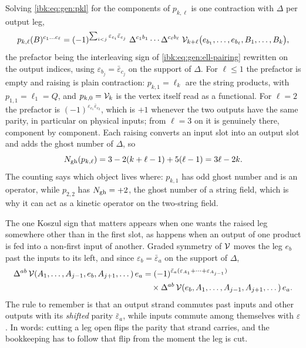 Solving \eqref{ibk:eq:gen:pkl} for the components of $p_{k,\ell}$ is one contraction with $\Delta$ per output leg,
\begin{equation}
  \label{ibk:eq:gen:pkl-comp}
  p_{k,\ell}(B)^{c_1\dots c_\ell}
    = (-1)^{\sum_{i<j}\varepsilon_{c_i}\bar\varepsilon_{c_j}}\;
      \Delta^{c_1b_1}\cdots\Delta^{c_\ell b_\ell}\;
      {\mathcal{V}}_{k+\ell}\bigl(e_{b_1},\dots,e_{b_\ell},B_1,\dots,B_k\bigr),
\end{equation}
the prefactor being the interleaving sign of \eqref{ibk:eq:gen:ell-pairing} rewritten on the output indices, using $\varepsilon_{b_j}=\bar\varepsilon_{c_j}$ on the support of $\Delta$. For $\ell\le1$ the prefactor is empty and raising is plain contraction: $p_{k,1}=\ell_k$ are the string products, with $p_{1,1}=\ell_1=Q$, and $p_{k,0}={\mathcal{V}}_k$ is the vertex itself read as a functional. For $\ell=2$ the prefactor is $(-1)^{\varepsilon_{c_1}\bar\varepsilon_{c_2}}$, which is $+1$ whenever the two outputs have the same parity, in particular on physical inputs; from $\ell=3$ on it is genuinely there, component by component. Each raising converts an input slot into an output slot and adds the ghost number of $\Delta$, so
\begin{equation}
  \label{ibk:eq:gen:ghost}
  N_{\rm gh}(p_{k,\ell})
    = 3-2(k+\ell-1)+5(\ell-1)
    = 3\ell-2k.
\end{equation}
The counting says which object lives where: $p_{k,1}$ has odd ghost number and is an operator, while $p_{2,2}$ has $N_{\rm gh}=+2$, the ghost number of a string field, which is why it can act as a kinetic operator on the two-string field.

The one Koszul sign that matters appears when one wants the raised leg somewhere other than in the first slot, as happens when an output of one product is fed into a non-first input of another. Graded symmetry of ${\mathcal{V}}$ moves the leg $e_b$ past the inputs to its left, and since $\varepsilon_b=\bar\varepsilon_a$ on the support of $\Delta$,
\begin{equation}
  \label{ibk:eq:gen:dressing}
  \begin{split}
    \Delta^{ab}\,{\mathcal{V}}(A_1,\dots,A_{j-1},e_b,A_{j+1},\dots)\,e_a
      &
      = (-1)^{\bar\varepsilon_a(\varepsilon_{A_1}+\cdots+\varepsilon_{A_{j-1}})}
    \\
      &
      \quad\times
        \Delta^{ab}\,{\mathcal{V}}(e_b,A_1,\dots,A_{j-1},A_{j+1},\dots)\,e_a.
  \end{split}
\end{equation}
The rule to remember is that an output strand commutes past inputs and other outputs with its \emph{shifted} parity $\bar\varepsilon_a$, while inputs commute among themselves with $\varepsilon$. In words: cutting a leg open flips the parity that strand carries, and the bookkeeping has to follow that flip from the moment the leg is cut.

